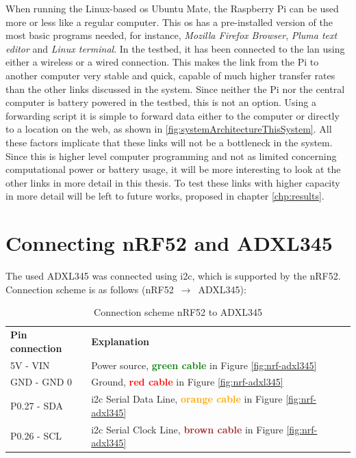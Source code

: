 \noindent When running the Linux-based \gls{os} Ubuntu Mate, the \gls{Raspberry Pi} can be used more or less like a regular computer. This \gls{os} has a pre-installed version of the most basic programs needed, for instance, \textit{Mozilla Firefox Browser}, \textit{Pluma text editor} and \textit{Linux terminal}. In the testbed, it has been connected to the \gls{lan} using either a wireless or a wired connection. This makes the link from the Pi to another computer very stable and quick, capable of much higher transfer rates than the other links discussed in the system. Since neither the Pi nor the central computer is battery powered in the testbed, this is not an option. Using a forwarding script it is simple to forward data either to the computer or directly to a location on the web, as shown in \ref{fig:systemArchitectureThisSystem}. All these factors implicate that these links will not be a bottleneck in the system. Since this is higher level computer programming and not as limited concerning computational power or battery usage, it will be more interesting to look at the other links in more detail in this thesis. To test these links with higher capacity in more detail will be left to future works, proposed in chapter \ref{chp:results}. 


\section{Connecting nRF52 and ADXL345}

\noindent The used \gls{ADXL345} was connected using \gls{i2c}, which is supported by the \gls{nRF52}. Connection scheme is as follows (\gls{nRF52} $\,\to\,$ \gls{ADXL345}): 

\begin{table}[H]
\centering
\caption{Connection scheme nRF52 to ADXL345}
\label{nRF52ADXL345connection}
\begin{tabular}{ll}
\textbf{Pin connection} & \textbf{Explanation}                                                                                            \\
5V - VIN               & Power source, \textbf{\textcolor{green}{green cable}} in Figure \ref{fig:nrf-adxl345}                   \\
GND - GND           0   & Ground, \textbf{\textcolor{red}{red cable}} in Figure \ref{fig:nrf-adxl345}                             \\
P0.27 - SDA            & \gls{i2c} Serial Data Line, \textbf{\textcolor{orange}{orange cable}} in Figure \ref{fig:nrf-adxl345} \\
P0.26 - SCL            & \gls{i2c} Serial Clock Line, \textbf{\textcolor{brown}{brown cable}} in Figure \ref{fig:nrf-adxl345} 
\end{tabular}
\end{table}


